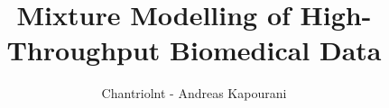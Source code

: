 \documentclass[mscres,ianc,abbrevs,logo,twoside]{infthesis}
\title{Mixture Modelling of High-Throughput Biomedical Data}
\author{Chantriolnt - Andreas Kapourani}
\begin{document}
  \begin{preliminary}
	\maketitle
	
	\standarddeclaration
	\tableofcontents
	\listoffigures
  \end{preliminary}
  
  
  
  
  
  
  
  
  \appendix
  
  
  
  
  
  
\end{document}
